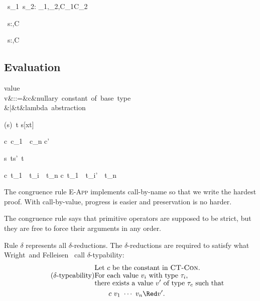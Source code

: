 \documentclass{amsart}
\theoremstyle{definition}
\begin{document}
{\Gamma\vdash\Add~s_1~s_2:
\Int\Given\sigma_1\Sub\Int,\sigma_2\Sub\Int,C_1\cup C_2}

{\Gamma\vdash\If~s:\alpha\R\alpha\R\alpha\Given\sigma\Sub\Bool,C}

{\Gamma\vdash\Fix~s:\alpha\Given\sigma\Sub \alpha\R\alpha,C}

\subsection{Evaluation}
\label{eval}

\begin{syntax}
\mbox{value}\\
v&::=&c&\mbox{nullary constant of base type}\\
&|&t&\mbox{lambda abstraction}
\end{syntax}

\infrule[$\beta$]
{}
{(s)~t \Red s[x\mapsto t]}

\infrule[$\delta$]
{}
{c~c_1~\cdots~c_n \Red c'}

{s~t\Red s'~t}

{c~t_1~\cdots~t_i~\cdots~t_n
\Red
c~t_1~\cdots~t_i'~\cdots~t_n
}

The congruence rule \textsc{E-App} implements call-by-name so
that we write the hardest proof. With call-by-value, progress is
easier and preservation is no harder.

The congruence rule  says that primitive operators
are supposed to be strict, but they are free to force their
arguments in any order.

Rule \textsc{$\delta$} represents all $\delta$-reductions. The
$\delta$-reductions are required to satisfy what
Wright~and Felleisen~\cite{Wright94} call $\delta$-typability:
\begin{align*}
&\text{Let $c$ be the constant in \textsc{CT-Con}.}\\[-4pt]
\tag{$\delta$-typeability}\label{delta-typability}
&\text{For each value $v_i$ with type $\tau_i$,}\\[-4pt]
&\text{there exists a value $v'$ of type $\tau_c$ such that}\\
&\hspace{2em}c~v_1~\cdots~v_n\Red v'.
\end{align*}
\end{document}
